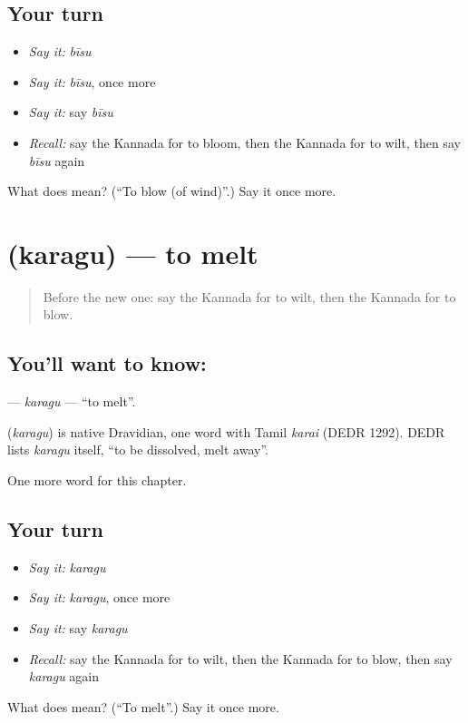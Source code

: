 \subsection*{Your turn}
\begin{itemize}
\raggedright
  \item \emph{Say it:} \emph{bīsu}
  \item \emph{Say it:} \emph{bīsu}, once more
  \item \emph{Say it:} say \emph{bīsu}
  \item \emph{Recall:} say the Kannada for to bloom, then the Kannada for to wilt, then say \emph{bīsu} again
\end{itemize}

\begin{tcolorbox}[breakable,colback=teal!4,colframe=teal!35!black,title={Before you move on}]
What does  mean? (\textquotedblleft{}To blow (of wind)\textquotedblright{}.) Say it once more.
\end{tcolorbox}
\section[\texorpdfstring{\kn{ಕರಗು} (karagu)}{ಕರಗು (karagu)}]{ (karagu) — to melt}

\label{lesson:KA-C203-karagu}



\begin{quote}
Before the new one: say the Kannada for to wilt, then the Kannada for to blow.
\end{quote}

\subsection*{You'll want to know: }
\textbf{} — \emph{karagu} — \textquotedblleft{}to melt\textquotedblright{}.

\begin{cousinweb}
\textbf{} (\emph{karagu}) is native Dravidian, one word with Tamil \emph{karai} (DEDR 1292). DEDR lists \emph{karagu} itself, \textquotedblleft{}to be dissolved, melt away\textquotedblright{}.
\end{cousinweb}

\begin{grammarlens}[title={What you've built}]
One more word for this chapter.
\end{grammarlens}

\subsection*{Your turn}
\begin{itemize}
\raggedright
  \item \emph{Say it:} \emph{karagu}
  \item \emph{Say it:} \emph{karagu}, once more
  \item \emph{Say it:} say \emph{karagu}
  \item \emph{Recall:} say the Kannada for to wilt, then the Kannada for to blow, then say \emph{karagu} again
\end{itemize}

\begin{tcolorbox}[breakable,colback=teal!4,colframe=teal!35!black,title={Before you move on}]
What does  mean? (\textquotedblleft{}To melt\textquotedblright{}.) Say it once more.
\end{tcolorbox}
